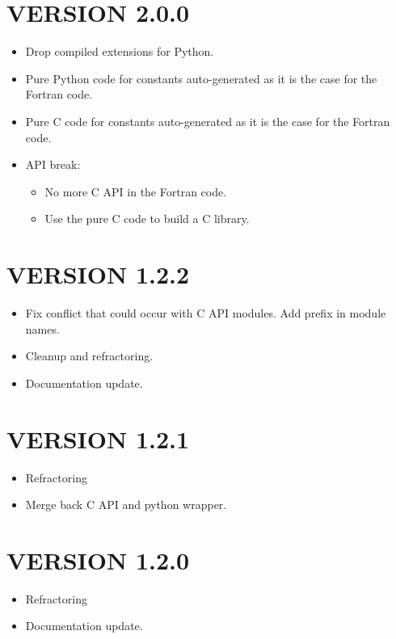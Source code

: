 \section*{VERSION 2.0.0}
\begin{itemize}
\item Drop compiled extensions for Python.
\item Pure Python code for constants auto-generated as it is the case for
      the Fortran code.
\item Pure C code for constants auto-generated as it is the case for the
      Fortran code.
\item API break:
\begin{itemize}
\item No more C API in the Fortran code.
\item Use the pure C code to build a C library.
\end{itemize}
\end{itemize}



\section*{VERSION 1.2.2}
\begin{itemize}
\item Fix conflict that could occur with C API modules. Add prefix in
      module names.
\item Cleanup and refractoring.
\item Documentation update.
\end{itemize}



\section*{VERSION 1.2.1}
\begin{itemize}
\item Refractoring
\item Merge back C API and python wrapper.
\end{itemize}



\section*{VERSION 1.2.0}
\begin{itemize}
\item Refractoring
\item Documentation update.
\end{itemize}



